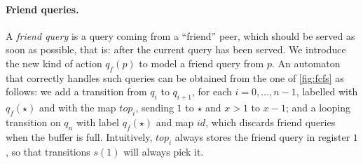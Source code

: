 %

\paragraph{Friend queries.} A \emph{friend query} is a query coming from a ``friend'' peer, which should be served as soon as possible, that is: after the current query has been served. We introduce the new kind of action $q_f(p)$ to model a friend query from $p$. An automaton that correctly handles such queries can be obtained from the one of \autoref{fig:fcfs} as follows: we add a transition from $q_i$ to $q_{i+1}$, for each $i=0,\dots,n-1$, labelled with $q_f(\star)$ and with the map $top_i$, sending $1$ to $\star$ and $x > 1$ to $x-1$; and a looping transition on $q_n$ with label $q_f(\star)$ and map $id$, which discards friend queries when the buffer is full. Intuitively, $top_i$ always stores the friend query in register $1$, so that transitions $s(1)$ will always pick it.
